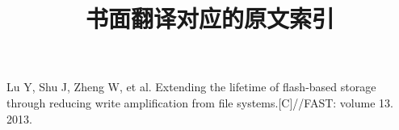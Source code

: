 
\title{书面翻译对应的原文索引}
\begin{translationbib}
\item Lu Y, Shu J, Zheng W, et al. Extending the lifetime of flash-based storage through reducing write amplification from file systems.[C]//FAST: volume 13. 2013.
\end{translationbib}
